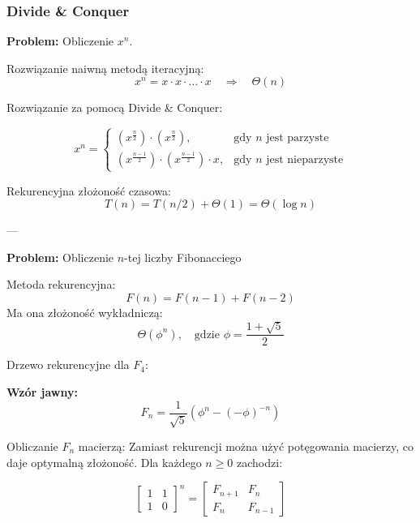 \documentclass{article}
\begin{document}
\subsubsection*{Divide \& Conquer}

\textbf{Problem:} Obliczenie $x^n$.  

Rozwiązanie naiwną metodą iteracyjną:  
\[
x^n = x \cdot x \cdot \dots \cdot x \quad \Rightarrow \quad \Theta(n)
\]

Rozwiązanie za pomocą Divide \& Conquer:  

\[
x^n =
\begin{cases}
    (x^{\frac{n}{2}}) \cdot (x^{\frac{n}{2}}), & \text{gdy } n \text{ jest parzyste} \\
    (x^{\frac{n-1}{2}}) \cdot (x^{\frac{n-1}{2}}) \cdot x, & \text{gdy } n \text{ jest nieparzyste}
\end{cases}
\]

Rekurencyjna złożoność czasowa:
\[
T(n) = T(n/2) + \Theta(1) = \Theta(\log n)
\]

---

\textbf{Problem:} Obliczenie $n$-tej liczby Fibonacciego  

Metoda rekurencyjna:
\[
F(n) = F(n-1) + F(n-2)
\]
Ma ona złożoność wykładniczą:
\[
\Theta (\phi^n), \quad \text{gdzie } \phi = \frac{1 + \sqrt{5}}{2}
\]

Drzewo rekurencyjne dla $F_4$:

\begin{center}
\end{center}

\textbf{Wzór jawny:}
\[
F_n = \frac{1}{\sqrt{5}} \left( \phi^n - (-\phi)^{-n} \right)
\]


Obliczanie $F_n$ macierzą:
Zamiast rekurencji można użyć potęgowania macierzy, co daje optymalną złożoność.  
Dla każdego $n \geq 0$ zachodzi:

\[
\begin{bmatrix}
    1 & 1 \\
    1 & 0
\end{bmatrix}^n
=
\begin{bmatrix}
    F_{n+1} & F_n \\
    F_n & F_{n-1}
\end{bmatrix}
\]
\end{document}
